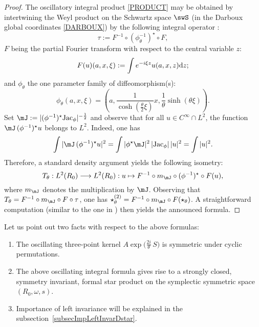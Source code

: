 \begin{proof}
	The oscillatory integral product \eqref{PRODUCT} may be obtained by intertwining the Weyl product on the Schwartz space $\swS$ (in the Darboux global coordinates \eqref{DARBOUX}) by the following integral operator \cite{Biel-Massar}:
	\begin{equation*}
		\tau:=F ^{-1}\circ(\phi_\theta^{-1})^\star\circ F,
	\end{equation*}
	$F $ being the partial Fourier transform with respect to        the central variable $z$:
	\begin{equation*}
		F (u)(a,x,\xi):=\int e^{-i\xi z}u(a,x,z){\rm d}z;
	\end{equation*}
	and $\phi_\theta$ the one parameter family of diffeomorphism(s):
	\begin{equation*}
		\phi_\theta(a,x,\xi)=(a,\frac{1}{\cosh(\frac{\theta}{2}\xi)}x,
		\frac{1}{\theta}\sinh(\theta\xi)).
	\end{equation*}
	Set $\mJ:=|(\phi^{-1})^\star\mbox{Jac}_\phi|^{-\frac{1}{2}}$ and observe that for all $u\in C^\infty\cap L^2$, the function $\mJ\,(\phi^{-1})^\star u$ belongs to $L^2$.  Indeed, one has
	\begin{equation*}
		\int|\mJ\,(\phi^{-1})^\star u|^2=\int|\phi^\star \mJ|^2\,|\mbox{Jac}_\phi|\,|u|^2=\int|u|^2.
	\end{equation*}
	Therefore, a standard density argument yields the following isometry:
	\begin{equation*}
		T_\theta:L^2(R_0)\longrightarrow L^2(R_0):
		u\mapsto F ^{-1}\circ m_\mJ\circ(\phi^{-1})^\star\circ F (u),
	\end{equation*}
	where  $m_{\mJ}$ denotes the multiplication by $\mJ$.  Observing that $T_\theta=F ^{-1}\circ m_{\mJ}\circ F \circ\tau$, one has $\star^{(2)}_\theta=F ^{-1}\circ m_{\mJ}\circ F (\star_\theta)$.  A straightforward computation (similar to the one in \cite{StrictSolvableSym})     then yields the announced formula.
\end{proof}

Let us point out two facts with respect to the above formulas:
\begin{enumerate}
	\item The oscillating three-point kernel $A\exp \big (\frac{2i}{\theta}\,S\big)$ is symmetric under cyclic permutations.
	\item The above oscillating integral formula gives rise to a strongly closed, symmetry invariant, formal star product on the symplectic symmetric space $(R_0,\omega,s)$.
	\item
	      Importance of left invariance will be explained in the subsection~\ref{subsecImpLeftInvarDstar}.
\end{enumerate}

